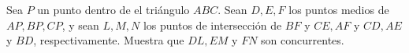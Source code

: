 Sea $P$ un punto dentro de el triángulo $ABC$. Sean $D,E,F$ los puntos medios de $AP,BP,CP$, y sean $L,M,N$ los puntos de intersección de $ BF$ y $CE, AF$ y $CD, AE$ y $BD$, respectivamente. Muestra que $DL,EM$ y $FN$ son concurrentes.